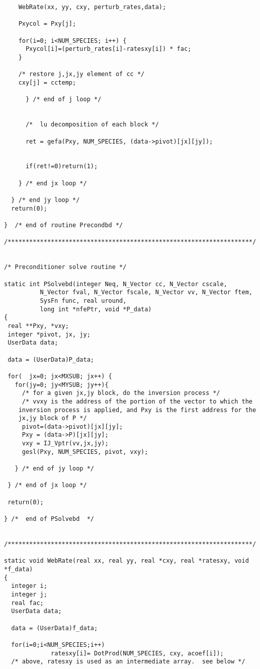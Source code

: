 \documentclass[11pt]{article}
\begin{document}
\begin{verbatim}
    WebRate(xx, yy, cxy, perturb_rates,data);

    Pxycol = Pxy[j];

    for(i=0; i<NUM_SPECIES; i++) {
      Pxycol[i]=(perturb_rates[i]-ratesxy[i]) * fac;
    }

    /* restore j,jx,jy element of cc */
    cxy[j] = cctemp;

      } /* end of j loop */


      /*  lu decomposition of each block */

      ret = gefa(Pxy, NUM_SPECIES, (data->pivot)[jx][jy]);


      if(ret!=0)return(1);

    } /* end jx loop */

  } /* end jy loop */
  return(0);

}  /* end of routine Precondbd */

/********************************************************************/


/* Preconditioner solve routine */

static int PSolvebd(integer Neq, N_Vector cc, N_Vector cscale,
          N_Vector fval, N_Vector fscale, N_Vector vv, N_Vector ftem,
          SysFn func, real uround, 
          long int *nfePtr, void *P_data)
{
 real **Pxy, *vxy;
 integer *pivot, jx, jy;
 UserData data;

 data = (UserData)P_data;
 
 for(  jx=0; jx<MXSUB; jx++) {
   for(jy=0; jy<MYSUB; jy++){
     /* for a given jx,jy block, do the inversion process */
     /* vvxy is the address of the portion of the vector to which the
    inversion process is applied, and Pxy is the first address for the 
    jx,jy block of P */
     pivot=(data->pivot)[jx][jy];
     Pxy = (data->P)[jx][jy];
     vxy = IJ_Vptr(vv,jx,jy);
     gesl(Pxy, NUM_SPECIES, pivot, vxy);

   } /* end of jy loop */

 } /* end of jx loop */

 return(0);

} /*  end of PSolvebd  */


/********************************************************************/

static void WebRate(real xx, real yy, real *cxy, real *ratesxy, void *f_data)
{
  integer i;
  integer j;
  real fac;
  UserData data;

  data = (UserData)f_data;

  for(i=0;i<NUM_SPECIES;i++) 
             ratesxy[i]= DotProd(NUM_SPECIES, cxy, acoef[i]);
  /* above, ratesxy is used as an intermediate array.  see below */


\end{verbatim}
\end{document}
